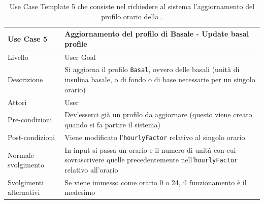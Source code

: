 \documentclass[twocolumn]{article}
\begin{document}
\begin{table}
    \centering
    \captionsetup{justification=centering}
    \begin{tabular}{|p{4.5cm}|p{9.5cm}|}
        \hline
        Use Case 5 & Aggiornamento del profilo di Basale - Update basal profile\\
        \hline
        Livello & User Goal \\
        \hline
        Descrizione & Si aggiorna il profilo \texttt{Basal}, ovvero delle basali (unità di insulina basale, o di fondo o di base necessarie per un singolo orario)\\
        \hline
        Attori & User \\
        \hline
        Pre-condizioni & Dev'esserci già un profilo da aggiornare (questo viene creato quando si fa partire il sistema)\\
        \hline
        Post-condizioni & Viene modificato l'\texttt{hourlyFactor} relativo al singolo orario\\
        \hline
        Normale svolgimento & In input si passa un orario e il numero di unità con cui sovrascrivere quelle precedentemente nell'\texttt{hourlyFactor} relativo all'orario\\
        \hline
        Svolgimenti alternativi & Se viene immesso come orario 0 o 24, il funzionamento è il medesimo\\
        \hline
    \end{tabular}
    \caption{Use Case Template 5 che consiste nel richiedere al sistema l'aggiornamento del profilo orario della .}
    \label{tab:uc5}
\end{table}
\end{document}
